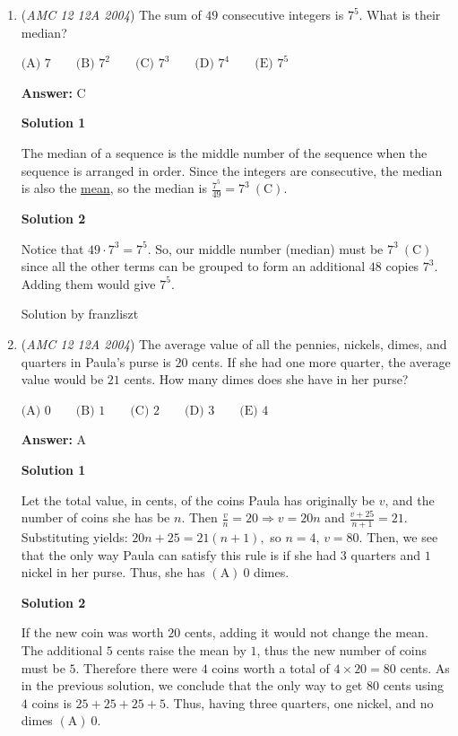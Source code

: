 \begin{enumerate}
	\item (\textit{AMC 12 12A 2004}) The sum of $49$ consecutive integers is $7^5$. What is their median?


 $\text {(A) } 7 \qquad \text {(B) } 7^2\qquad \text {(C) } 7^3\qquad \text {(D) } 7^4\qquad \text {(E) }7^5$

 \textbf{Answer: }C



\textbf{Solution 1}

The median of a sequence is the middle number of the sequence when the sequence is arranged in order. Since the integers are consecutive, the median is also the \href{https://artofproblemsolving.com/wiki/index.php?title=Mean}{mean}, so the median is $\frac{7^5}{49} = 7^3\ \mathrm{(C)}$.

 



\textbf{Solution 2}

Notice that $49\cdot7^3=7^5$. So, our middle number (median) must be $7^3\ \mathrm{(C)}$ since all the other terms can be grouped to form an additional $48$ copies $7^3$. Adding them would give $7^5$.  

 Solution by franzliszt

 


	\item (\textit{AMC 12 12A 2004}) The average value of all the pennies, nickels, dimes, and quarters in Paula's purse is $20$ cents. If she had one more quarter, the average value would be $21$ cents. How many dimes does she have in her purse?


 $\text {(A) }0 \qquad \text {(B) } 1 \qquad \text {(C) } 2 \qquad \text {(D) } 3\qquad \text {(E) }4$

 \textbf{Answer: }A



\textbf{Solution 1}

Let the total value, in cents, of the coins Paula has originally be $v$, and the number of coins she has be $n$. Then $\frac{v}{n}=20\Longrightarrow v=20n$ and $\frac{v+25}{n+1}=21$. Substituting yields: $20n+25=21(n+1),$ so $n=4$, $v = 80.$  Then, we see that the only way Paula can satisfy this rule is if she had $3$ quarters and $1$ nickel in her purse. Thus, she has $\boxed{\mathrm{(A)}\ 0}$ dimes.

 



\textbf{Solution 2}

If the new coin was worth $20$ cents, adding it would not change the mean. The additional $5$ cents raise the mean by $1$, thus the new number of coins must be $5$. Therefore there were $4$ coins worth a total of $4\times20=80$ cents. As in the previous solution, we conclude that the only way to get $80$ cents using $4$ coins is $25+25+25+5$. Thus, having three quarters, one nickel, and no dimes $\boxed{\mathrm{(A)}\ 0}.$


\end{enumerate}
